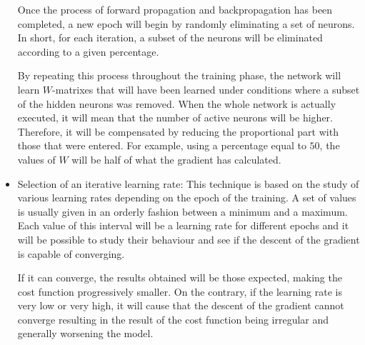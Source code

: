 \begin{itemize}
    
    Once the process of forward propagation and backpropagation has been completed, a new epoch will begin by randomly eliminating a set of neurons. In short, for each iteration, a subset of the neurons will be eliminated according to a given percentage.
    \newline
    
    By repeating this process throughout the training phase, the network will learn $W$-matrixes that will have been learned under conditions where a subset of the hidden neurons was removed. When the whole network is actually executed, it will mean that the number of active neurons will be higher. Therefore, it will be compensated by reducing the proportional part with those that were entered. For example, using a percentage equal to $50$, the values of $W$ will be half of what the gradient has calculated.
    
    \item Selection of an iterative learning rate: This technique is based on the study of various learning rates depending on the epoch of the training. A set of values is usually given in an orderly fashion between a minimum and a maximum. Each value of this interval will be a learning rate for different epochs and it will be possible to study their behaviour and see if the descent of the gradient is capable of converging.
    \newline
    
    If it can converge, the results obtained will be those expected, making the cost function progressively smaller. On the contrary, if the learning rate is very low or very high, it will cause that the descent of the gradient cannot converge resulting in the result of the cost function being irregular and generally worsening the model.

\end{itemize}

